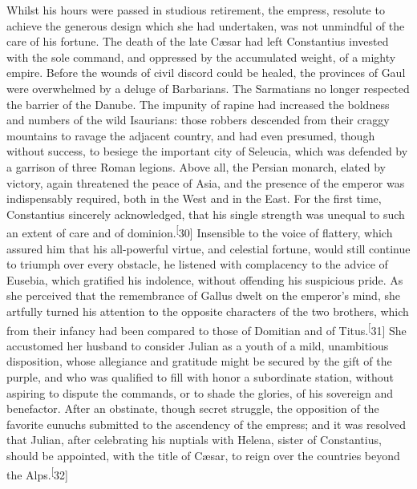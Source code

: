
Whilst his hours were passed in studious retirement, the empress,
resolute to achieve the generous design which she had undertaken,
was not unmindful of the care of his fortune. The death of the
late Cæsar had left Constantius invested with the sole command,
and oppressed by the accumulated weight, of a mighty empire.
Before the wounds of civil discord could be healed, the provinces
of Gaul were overwhelmed by a deluge of Barbarians. The
Sarmatians no longer respected the barrier of the Danube. The
impunity of rapine had increased the boldness and numbers of the
wild Isaurians: those robbers descended from their craggy
mountains to ravage the adjacent country, and had even presumed,
though without success, to besiege the important city of
Seleucia, which was defended by a garrison of three Roman
legions. Above all, the Persian monarch, elated by victory, again
threatened the peace of Asia, and the presence of the emperor was
indispensably required, both in the West and in the East. For the
first time, Constantius sincerely acknowledged, that his single
strength was unequal to such an extent of care and of dominion.\textsuperscript[30]
Insensible to the voice of flattery, which assured him that
his all-powerful virtue, and celestial fortune, would still
continue to triumph over every obstacle, he listened with
complacency to the advice of Eusebia, which gratified his
indolence, without offending his suspicious pride. As she
perceived that the remembrance of Gallus dwelt on the emperor’s
mind, she artfully turned his attention to the opposite
characters of the two brothers, which from their infancy had been
compared to those of Domitian and of Titus.\textsuperscript[31] She accustomed her
husband to consider Julian as a youth of a mild, unambitious
disposition, whose allegiance and gratitude might be secured by
the gift of the purple, and who was qualified to fill with honor
a subordinate station, without aspiring to dispute the commands,
or to shade the glories, of his sovereign and benefactor. After
an obstinate, though secret struggle, the opposition of the
favorite eunuchs submitted to the ascendency of the empress; and
it was resolved that Julian, after celebrating his nuptials with
Helena, sister of Constantius, should be appointed, with the
title of Cæsar, to reign over the countries beyond the Alps.\textsuperscript[32]

